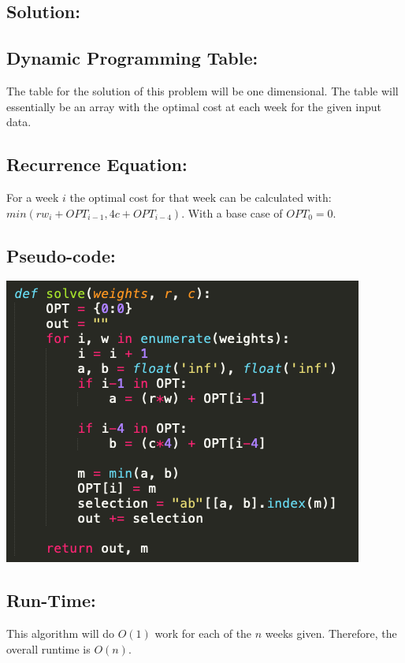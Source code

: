 \documentclass[11pt]{article}
\begin{document}
\newpage
\subsection*{Solution:}
\subsection*{Dynamic Programming Table:}
The table for the solution of this problem will be one dimensional.
The table will essentially be an array with the optimal cost at each week for the given input data.

\subsection*{Recurrence Equation:}
For a week $i$ the optimal cost for that week can be calculated with: $min(rw_i + OPT_{i-1}, 4c + OPT_{i-4})$.
With a base case of $OPT_0 = 0$.

\subsection*{Pseudo-code:}
\includegraphics[scale=0.5]{two_code.png}

\subsection*{Run-Time:}
This algorithm will do $O(1)$ work for each of the $n$ weeks given.
Therefore, the overall runtime is $O(n)$.


\newpage
\end{document}

